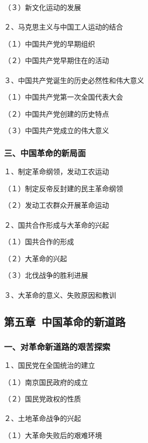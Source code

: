 \documentclass{ctexart}
\begin{document}
（３）新文化运动的发展
\\\\

２、马克思主义与中国工人运动的结合

（１）中国共产党的早期组织

（２）中国共产党早期住在的活动
\\\\

３、中国共产党诞生的历史必然性和伟大意义

（１）中国共产党第一次全国代表大会

（２）中国共产党创建的历史特点

（３）中国共产党成立的伟大意义

\subsubsection{三、中国革命的新局面}

１、制定革命纲领，发动工农运动

（１）制定反帝反封建的民主革命纲领

（２）发动工农群众开展革命运动
\\\\

２、国共合作形成与大革命的兴起

（１）国共合作的形成

（２）大革命的兴起

（３）北伐战争的胜利进展
\\\\

３、大革命的意义、失败原因和教训

\subsection{第五章\ 中国革命的新道路}

\subsubsection{一、对革命新道路的艰苦探索}

１、国民党在全国统治的建立

（１）南京国民政府的成立

（２）国民党政权的性质
\\\\

２、土地革命战争的兴起

（１）大革命失败后的艰难环境
\end{document}
